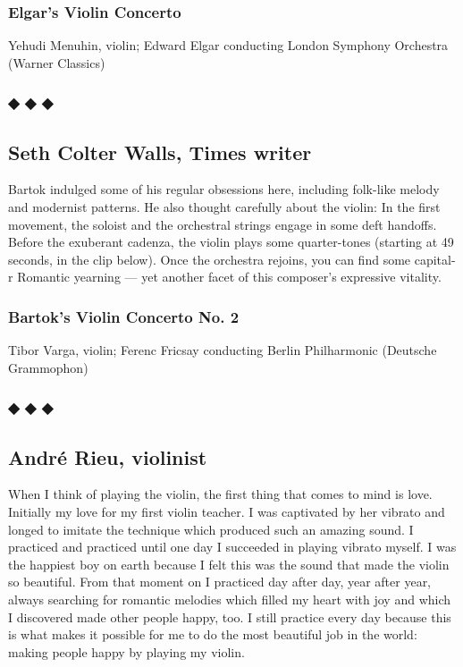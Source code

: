 \hypertarget{elgars-violin-concerto}{%
\subsubsection{Elgar's Violin Concerto}\label{elgars-violin-concerto}}

Yehudi Menuhin, violin; Edward Elgar conducting London Symphony
Orchestra (Warner Classics)

\hypertarget{---14}{%
\subsubsection{◆ ◆ ◆}\label{---14}}

\hypertarget{seth-colter-walls-times-writer}{%
\subsection{Seth Colter Walls, Times
writer}\label{seth-colter-walls-times-writer}}

Bartok indulged some of his regular obsessions here, including folk-like
melody and modernist patterns. He also thought carefully about the
violin: In the first movement, the soloist and the orchestral strings
engage in some deft handoffs. Before the exuberant cadenza, the violin
plays some quarter-tones (starting at 49 seconds, in the clip below).
Once the orchestra rejoins, you can find some capital-r Romantic
yearning --- yet another facet of this composer's expressive vitality.

\hypertarget{bartoks-violin-concerto-no-2}{%
\subsubsection{Bartok's Violin Concerto No.
2}\label{bartoks-violin-concerto-no-2}}

Tibor Varga, violin; Ferenc Fricsay conducting Berlin Philharmonic
(Deutsche Grammophon)

\hypertarget{---15}{%
\subsubsection{◆ ◆ ◆}\label{---15}}

\hypertarget{andruxe9-rieu-violinist}{%
\subsection{André Rieu, violinist}\label{andruxe9-rieu-violinist}}

﻿When I think of playing the violin, the first thing that comes to mind
is love. Initially my love for my first violin teacher. I was captivated
by her vibrato and longed to imitate the technique which produced such
an amazing sound. I practiced and practiced until one day I succeeded in
playing vibrato myself. I was the happiest boy on earth because I felt
this was the sound that made the violin so beautiful. From that moment
on I practiced day after day, year after year, always searching for
romantic melodies which filled my heart with joy and which I discovered
made other people happy, too. I still practice every day because this is
what makes it possible for me to do the most beautiful job in the world:
making people happy by playing my violin.


